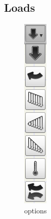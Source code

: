 \documentclass[a4paper,11pt]{report}
\begin{document}
\subsection{Loads}

\begin{minipage}[h]{4cm}
\begin{figure}[H]
\begin{center}
\includegraphics[scale=0.6]{../pictures/load_opt.png}
\caption{options}
\label{pic:load_opt}
\end{center}
\end{figure}
\end{minipage}
\end{document}
